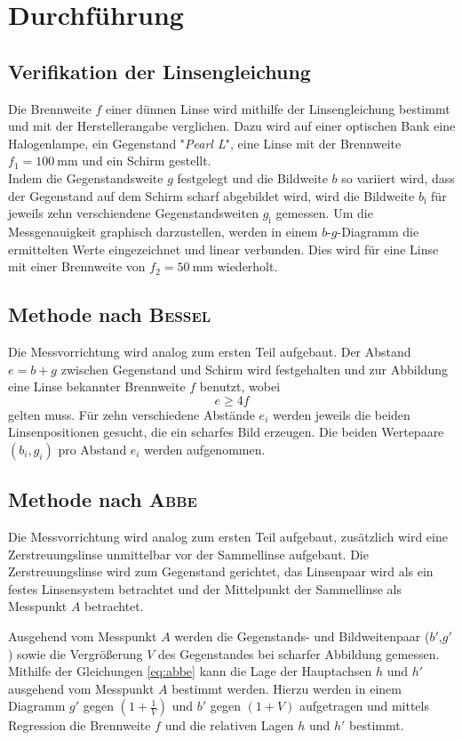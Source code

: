 \section{Durchführung}
\label{sec:Durchfuehrung}
\subsection{Verifikation der Linsengleichung}
Die Brennweite $f$ einer dünnen Linse wird mithilfe der Linsengleichung bestimmt und mit der Herstellerangabe verglichen.
Dazu wird auf einer optischen Bank eine Halogenlampe, ein Gegenstand "\emph{Pearl L}",  eine Linse mit der Brennweite $f_1=\SI{100}{\milli\meter}$ und ein Schirm gestellt. \\
Indem die Gegenstandsweite $g$ festgelegt und die Bildweite $b$ so variiert wird, dass der Gegenstand auf dem Schirm scharf abgebildet wird, wird die Bildweite $b_\text{i}$ für jeweils zehn verschiendene Gegenstandsweiten $g_\text{i}$ gemessen.
Um die Messgenauigkeit graphisch darzustellen, werden in einem $b$-$g$-Diagramm die ermittelten Werte eingezeichnet und linear verbunden.
Dies wird für eine Linse mit einer Brennweite von $f_2=\SI{50}{\milli\meter}$ wiederholt.


\subsection{Methode nach \textsc{Bessel}}
Die Messvorrichtung wird analog zum ersten Teil aufgebaut.
Der Abstand \\$e=b+g$ zwischen Gegenstand und Schirm wird festgehalten und zur Abbildung eine Linse bekannter Brennweite $f$ benutzt, wobei 
\begin{equation}
	e\ge4f
\end{equation}
gelten muss.
Für zehn verschiedene Abstände $e_i$ werden jeweils die beiden Linsenpositionen gesucht, die ein scharfes Bild erzeugen. 
Die beiden Wertepaare $(b_i,g_i)$ pro Abstand $e_i$ werden aufgenommen.

\subsection{Methode nach \textsc{Abbe}}
Die Messvorrichtung wird analog zum ersten Teil aufgebaut, zusätzlich wird eine Zerstreuungslinse unmittelbar vor der Sammellinse aufgebaut.
Die Zerstreuungslinse wird zum Gegenstand gerichtet, das Linsenpaar wird als ein festes Linsensystem betrachtet und der Mittelpunkt der Sammellinse als Messpunkt $A$ betrachtet.

Ausgehend vom Messpunkt $A$ werden die Gegenstands- und Bildweitenpaar ($b'$,$g'$) sowie die Vergrößerung $V$ des Gegenstandes bei scharfer Abbildung gemessen. Mithilfe der Gleichungen \eqref{eq:abbe} kann die Lage der Hauptachsen $h$ und $h'$ ausgehend vom Messpunkt $A$ bestimmt werden.
Hierzu werden in einem Diagramm
$g′$ gegen $(1+\frac{1}{V})$ und $b′$ gegen $(1+V)$ aufgetragen und mittels Regression die Brennweite $f$ und die relativen Lagen $h$ und $h'$ bestimmt.

